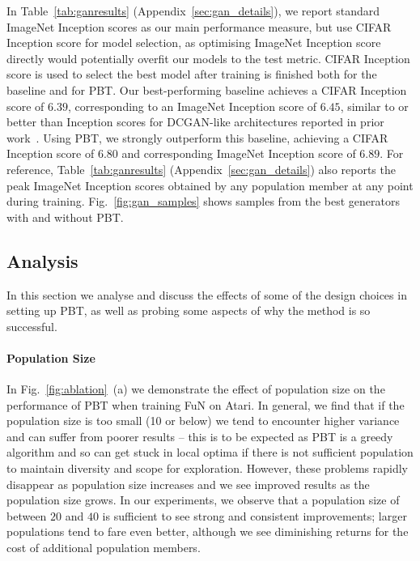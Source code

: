 \documentclass{article} %
\newcommand{\figref}[1]{Fig.~\ref{#1}}
\begin{document}
In Table~\ref{tab:ganresults} (Appendix~\ref{sec:gan_details}),
we report standard ImageNet Inception scores as our main performance measure, but use CIFAR Inception score for model selection, as optimising ImageNet Inception score directly would potentially overfit our models to the test metric.
CIFAR Inception score is used to select the best model after training is finished both for the baseline and for PBT.
Our best-performing baseline achieves a CIFAR Inception score of $6.39$, corresponding to an ImageNet Inception score of $6.45
$, similar to or better than Inception scores for DCGAN-like architectures reported in prior work~\citep{mihaelaalphagan,improvedwgan,lrgan}.
Using PBT, we strongly outperform this baseline, achieving a CIFAR Inception score of $6.80$ and corresponding ImageNet Inception score of $6.89
$.
For reference,
Table~\ref{tab:ganresults} (Appendix~\ref{sec:gan_details}) also reports the peak ImageNet Inception scores obtained by any population member at any point during training.
\figref{fig:gan_samples} shows samples from the best generators with and without PBT.







\subsection{Analysis}\label{sec:analysis}

In this section we analyse and discuss the effects of some of the design choices in setting up PBT, as well as probing some aspects of why the method is so successful.



\paragraph{Population Size}\label{sec:analysis_pop_size}

In \figref{fig:ablation}~(a) we demonstrate the effect of population size on the performance of PBT when training FuN on Atari. In general, we find that if the population size is too small (10 or below) we tend to encounter higher variance and can suffer from poorer results -- this is to be expected as PBT is a greedy algorithm and so can get stuck in local optima if there is not sufficient population to maintain diversity and scope for exploration. However, these problems rapidly disappear as population size increases and we see improved results as the population size grows. In our experiments, we observe that a population size of between $20$ and $40$ is sufficient to see strong and consistent improvements; larger populations tend to fare even better, although we see diminishing returns for the cost of additional population members.
\end{document}
